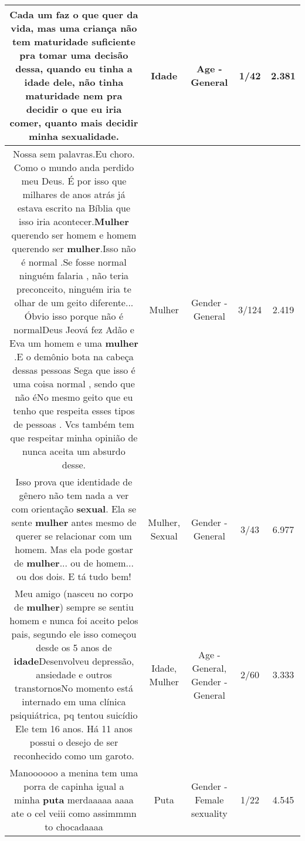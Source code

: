 \documentclass[11pt]{article}
\newlength\mylength
\begin{document}
\begin{center}
\begin{longtable}{|C{.65\mylength}|C{.30\mylength}|C{.12\mylength}|C{.12\mylength}|C{.12\mylength}|}
  \small Cada um faz o que quer da vida, mas uma criança não tem maturidade suficiente pra tomar uma decisão dessa, quando eu tinha a \textbf{idade} dele, não tinha maturidade nem pra decidir o que eu iria comer, quanto mais decidir minha sexualidade.\normalsize   & Idade & Age - General & 1/42 & 2.381 \\  \hline
  \small Nossa sem palavras.Eu choro. Como o mundo anda perdido meu Deus. É por isso que milhares de anos atrás já estava escrito na Bíblia que isso iria acontecer.\textbf{Mulher} querendo ser homem e homem querendo ser \textbf{mulher}.Isso não é normal .Se fosse normal ninguém falaria , não teria preconceito, ninguém iria te olhar de um geito diferente... Óbvio isso porque não é normalDeus Jeová  fez Adão e Eva um homem e uma \textbf{mulher} .E o demônio bota na cabeça dessas pessoas Sega que isso é uma coisa normal , sendo que não éNo mesmo geito que eu tenho que respeita esses tipos de pessoas . Vcs também tem que respeitar minha opinião de nunca aceita um absurdo desse.\normalsize   & Mulher & Gender - General & 3/124 & 2.419 \\  \hline
  \small Isso prova que identidade de gênero não tem nada a ver com orientação \textbf{sexual}. Ela se sente \textbf{mulher} antes mesmo de querer se relacionar com um homem. Mas ela pode gostar de \textbf{mulher}... ou de homem... ou dos dois. E tá tudo bem!\normalsize   & Mulher, Sexual & Gender - General & 3/43 & 6.977 \\  \hline
  \small Meu amigo (nasceu no corpo de \textbf{mulher}) sempre se sentiu homem e nunca foi aceito pelos pais, segundo ele isso começou desde os 5 anos de \textbf{idade}Desenvolveu depressão, ansiedade e outros transtornosNo momento está internado em uma clínica psiquiátrica, pq tentou suicídio Ele tem 16 anos. Há 11 anos possui  o desejo de ser reconhecido como um garoto.\normalsize   & Idade, Mulher & Age - General, Gender - General & 2/60 & 3.333 \\  \hline
  \small Manoooooo a menina tem uma porra de capinha igual a minha \textbf{puta} merdaaaaa aaaa ate o cel veiii como assimmmn to chocadaaaa\normalsize   & Puta & Gender - Female sexuality & 1/22 & 4.545 \\  \hline

\end{longtable}
\end{center}
\end{document}
